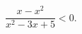 \begin{ex}[type=inequality]
	\begin{condition}
		$\dfrac{x  - x^2}{x^2 - 3x + 5} <0 .$
	\end{condition}
\end{ex}